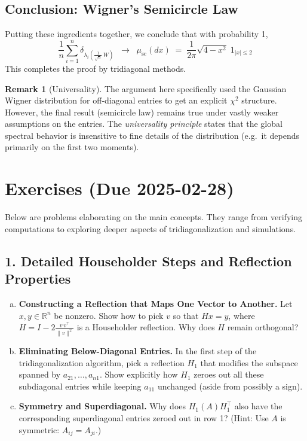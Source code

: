 \documentclass[letterpaper,11pt,oneside,reqno]{article}
\numberwithin{equation}{section}
\theoremstyle{definition}
\newtheorem{remark}[proposition]{Remark}
\begin{document}
\subsection{Conclusion: Wigner’s Semicircle Law}

Putting these ingredients together, we conclude that with probability 1,
\[
  \frac{1}{n}\sum_{i=1}^n \delta_{\lambda_i(\frac1{\sqrt{n}}\,W)}
  \;\;\longrightarrow\;\;
  \mu_{\mathrm{sc}}(dx) \;=\; \frac{1}{2\pi}\sqrt{4-x^2}\; 1_{|x|\le2}
\]
This completes the proof by tridiagonal methods.

\begin{remark}[Universality]
The argument here specifically used the Gaussian Wigner distribution for off-diagonal entries to get an explicit $\chi^2$ structure. However, the final result (semicircle law) remains true under vastly weaker assumptions on the entries. The \emph{universality principle} states that the global spectral behavior is insensitive to fine details of the distribution (e.g.\ it depends primarily on the first two moments).
\end{remark}







\section{Exercises (Due 2025-02-28)}
\label{sec:exercises}

Below are problems elaborating on the main concepts. They range from verifying computations to exploring deeper aspects of tridiagonalization and simulations.

\subsection*{1. Detailed Householder Steps and Reflection Properties}

\begin{enumerate}[(a)]
\item {\bf Constructing a Reflection that Maps One Vector to Another.}
  Let $x,y\in \mathbb{R}^n$ be nonzero. Show how to pick $v$ so that $Hx=y$, where $H=I-2\frac{v\,v^\top}{\|v\|^2}$ is a Householder reflection. Why does $H$ remain orthogonal?
\item {\bf Eliminating Below-Diagonal Entries.}
  In the first step of the tridiagonalization algorithm, pick a reflection $H_1$ that modifies the subspace spanned by $a_{21},\dots,a_{n1}$. Show explicitly how $H_1$ zeroes out all these subdiagonal entries while keeping $a_{11}$ unchanged (aside from possibly a sign).
\item {\bf Symmetry and Superdiagonal.}
  Why does $H_1 (A) H_1^\top$ also have the corresponding superdiagonal entries zeroed out in row 1? (Hint: Use $A$ is symmetric: $A_{ij}=A_{ji}$.)
\end{enumerate}
\end{document}
